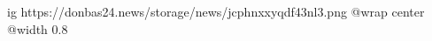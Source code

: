  
 
 
 
 

\ifcmt
  ig https://donbas24.news/storage/news/jcphnxxyqdf43nl3.png
  @wrap center
  @width 0.8
\fi
